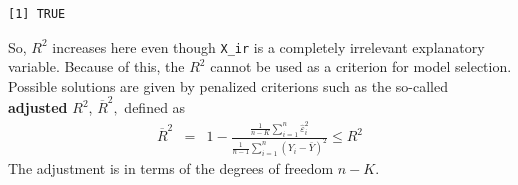 \documentclass[
  letterpaper,
  DIV=11,
  numbers=noendperiod]{scrreprt}
\newenvironment{Shaded}{\begin{snugshade}}{\end{snugshade}}
\newcommand{\AttributeTok}[1]{\textcolor[rgb]{0.40,0.45,0.13}{#1}}
\newcommand{\CommentTok}[1]{\textcolor[rgb]{0.37,0.37,0.37}{#1}}
\newcommand{\DecValTok}[1]{\textcolor[rgb]{0.68,0.00,0.00}{#1}}
\newcommand{\FunctionTok}[1]{\textcolor[rgb]{0.28,0.35,0.67}{#1}}
\newcommand{\NormalTok}[1]{\textcolor[rgb]{0.00,0.23,0.31}{#1}}
\newcommand{\OtherTok}[1]{\textcolor[rgb]{0.00,0.23,0.31}{#1}}
\newcommand{\SpecialCharTok}[1]{\textcolor[rgb]{0.37,0.37,0.37}{#1}}
\theoremstyle{definition}
\theoremstyle{plain}
\theoremstyle{plain}
\theoremstyle{remark}
\begin{document}
\begin{Shaded}
\end{Shaded}

\begin{verbatim}
[1] TRUE
\end{verbatim}

So, \(R^2\) increases here even though \texttt{X\_ir} is a completely
irrelevant explanatory variable. Because of this, the \(R^2\) cannot be
used as a criterion for model selection. Possible solutions are given by
penalized criterions such as the so-called \textbf{adjusted} \(R^2\),
\(\overline{R}^2,\) defined as \begin{eqnarray*}
  \overline{R}^2&=&1-\frac{\frac{1}{n-K}\sum_{i=1}^n\hat{\varepsilon}^2_i}{\frac{1}{n-1}\sum_{i=1}^n\left(Y_i-\bar{Y}\right)^2}\leq R^2%
\end{eqnarray*} The adjustment is in terms of the degrees of freedom
\(n-K\).
\end{document}
